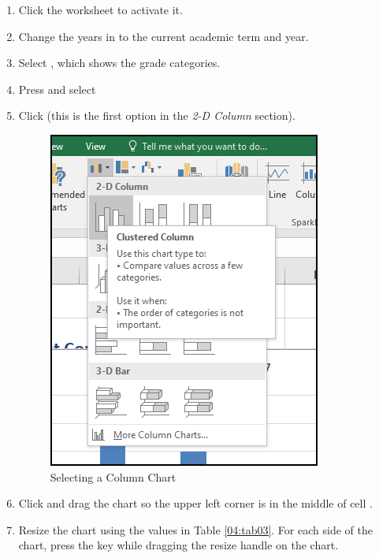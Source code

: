\begin{enumerate}
	\item Click the  worksheet to activate it.
	\item Change the years in  to the current academic term and year.
	\item Select , which shows the grade categories.
	\item Press  and select 
	\item Click  (this is the first option in the \textit{2-D Column} section).
	
	\begin{figure}[H]
		\centering
		\includegraphics[width=\maxwidth{.65\linewidth}]{gfx/ch04_fig13}
		\caption{Selecting a Column Chart}
		\label{04:fig13}
	\end{figure}
		
	\item Click and drag the chart so the upper left corner is in the middle of cell .
	\item Resize the chart using the values in Table \ref{04:tab03}. For each side of the chart, press the  key while dragging the resize handle on the chart.
\end{enumerate}	


